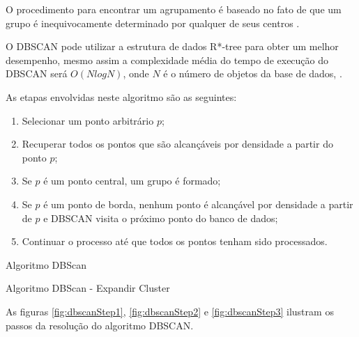 O procedimento para encontrar um agrupamento é baseado no fato de que um grupo é inequivocamente determinado por qualquer de seus centros \cite{ESTER1998}. 

O DBSCAN pode utilizar a estrutura de dados R*-tree para obter um melhor desempenho, mesmo assim  a complexidade média do tempo de execução do DBSCAN será ${O (N logN)}$, onde ${N}$ é o número de objetos da base de dados, \cite{Sheikholeslami1998}.


As etapas envolvidas neste algoritmo são as seguintes:

\begin{enumerate}
	\item Selecionar um ponto arbitrário ${p}$;
	\item Recuperar todos os pontos que são alcançáveis por densidade a partir do ponto ${p}$;
	\item Se ${p}$ é um ponto central, um grupo é formado;
	\item Se ${p}$ é um ponto de borda, nenhum ponto é alcançável por densidade a partir de ${p}$ e DBSCAN visita o próximo ponto do banco de dados;
	\item Continuar o processo até que todos os pontos tenham sido processados.
\end{enumerate}


\begin{algorithm}[!ht]
	\SetSpacedAlgorithm
	\caption{\label{alg:algoritmo_dbscan}Algoritmo DBScan}
\end{algorithm}
\begin{algorithm}[!ht]
	\SetSpacedAlgorithm
	\caption{\label{alg:algoritmo_dbscan_exp}Algoritmo DBScan - Expandir Cluster}
\end{algorithm}
\pagebreak
As figuras \ref{fig:dbscanStep1}, \ref{fig:dbscanStep2} e \ref{fig:dbscanStep3} ilustram os passos da resolução do algoritmo DBSCAN.

